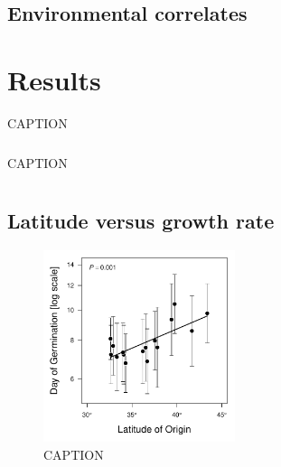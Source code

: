 \documentclass[11pt, oneside]{article}
\begin{document}

\subsection*{Environmental correlates}


\section*{Results}

\begin{table}[htbp]
	\fontsize{10}{12}
	\selectfont
	\caption[ANOVA table, leaf expansion rate]{CAPTION}
	\begin{center}
	\begin{tabular}{lcccccc}
	\toprule

	

	\bottomrule
	\end{tabular}
	\end{center}
\end{table}

\begin{table}[htbp]
	\fontsize{10}{12}
	\selectfont
	\caption[ANOVA table, stem expansion rate]{CAPTION}
	\begin{center}
	\begin{tabular}{lcccccc}
	\toprule

	

	\bottomrule
	\end{tabular}
	\end{center}
\end{table}

\subsection*{Latitude versus growth rate}

\begin{figure}[h!]
	\centerline{\includegraphics[width=0.5\textwidth]{Figures/Figure_DoG_Lat.pdf}}
	\fontsize{10}{12}
	\selectfont
	\caption[Southern populations germinate sooner.]{CAPTION}
	\label{fig:Fig_DoG}
\end{figure}
\end{document}
